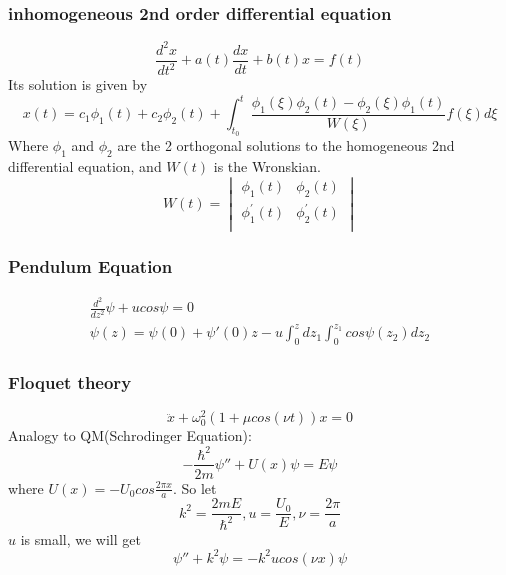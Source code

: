 \subsubsection{inhomogeneous 2nd order differential equation}
\begin{equation}
    \frac{d^{2}x}{dt^2} + a(t)\frac{dx}{dt} + b(t)x = f(t)
\end{equation}
Its solution is given by
\begin{equation}
    \displaystyle x(t) = c_{1}\phi_{1}(t) + c_{2}\phi_{2}(t) + \int_{t_0}^{t}\frac{\phi_{1}(\xi)\phi_{2}(t) - \phi_{2}(\xi)\phi_{1}(t)}{W(\xi)} f(\xi)d\xi
\end{equation}
Where $\phi_{1}$ and $\phi_{2}$ are the 2 orthogonal solutions to the homogeneous 2nd differential equation, and $W(t)$ is the Wronskian.
\begin{equation}
    W(t) = 
	\begin{vmatrix}
	    \phi_1(t)	    & \phi_2(t) \\
	    \phi_1^{'}(t)   & \phi_2^{'}(t)	\\
	\end{vmatrix}
\end{equation}


\subsubsection{Pendulum Equation}
\begin{equation}
    \begin{gathered}
	\frac{d^2}{dz^2}\psi + ucos\psi = 0 \\
	\psi(z) = \psi(0) + \psi'(0)z - u\int_0^z dz_1 \int_0^{z_1}cos\psi(z_2)dz_2
    \end{gathered}
\end{equation}
\subsubsection{Floquet theory}
\begin{equation}
    \ddot{x} + \omega_{0}^{2}(1+\mu cos(\nu t))x = 0
\end{equation}
Analogy to QM(Schrodinger Equation):	
\[
    -\frac{\hbar^{2}}{2m}{\psi''} + U(x)\psi = E\psi
    \]
where $U(x) = -U_{0}cos\frac{2\pi x}{a}$.
So let 
\[
    k^{2} = \frac{2mE}{\hbar^{2}}, u=\frac{U_0}{E}, \nu=\frac{2\pi}{a}
    \]
$u$ is small, we will get   
\[ 
    \psi''+k^{2}\psi = -k^{2}ucos(\nu x)\psi
    \]

